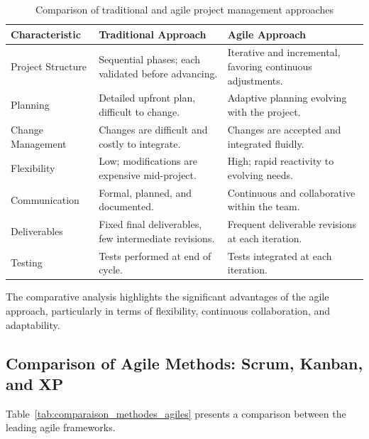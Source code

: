 \begin{table}[H]
\small
\centering
\caption{Comparison of traditional and agile project management approaches}
\label{tab:comparaison_traditionnelle_agile}
\renewcommand{\arraystretch}{1.4}
\begin{tabular}{|p{2.8cm}|p{5.5cm}|p{5.5cm}|}
\hline
\rowcolor{blue!15}
\textbf{Characteristic} & \textbf{Traditional Approach} & \textbf{Agile Approach} \\
\hline
Project Structure & Sequential phases; each validated before advancing. & Iterative and incremental, favoring continuous adjustments. \\
\hline
Planning & Detailed upfront plan, difficult to change. & Adaptive planning evolving with the project. \\
\hline
Change Management & Changes are difficult and costly to integrate. & Changes are accepted and integrated fluidly. \\
\hline
Flexibility & Low; modifications are expensive mid-project. & High; rapid reactivity to evolving needs. \\
\hline
Communication & Formal, planned, and documented. & Continuous and collaborative within the team. \\
\hline
Deliverables & Fixed final deliverables, few intermediate revisions. & Frequent deliverable revisions at each iteration. \\
\hline
Testing & Tests performed at end of cycle. & Tests integrated at each iteration. \\
\hline
\end{tabular}
\end{table}

The comparative analysis highlights the significant advantages of the agile approach,
particularly in terms of flexibility, continuous collaboration, and adaptability.

\subsection{Comparison of Agile Methods: Scrum, Kanban, and XP}

Table~\ref{tab:comparaison_methodes_agiles} presents a comparison between the leading agile
frameworks.

